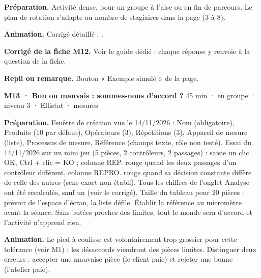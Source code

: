 \textbf{Préparation.} Activité dense, pour un groupe à l'aise ou en fin de parcours. Le plan de rotation s'adapte au nombre de stagiaires dans la page (3 à 8).\par
\textbf{Animation.} Corrigé détaillé : .\par
\textbf{\color{ok}Corrigé de la fiche M12.} Voir le guide dédié : chaque réponse y renvoie à la question de la fiche.\par
{\small\textbf{Repli ou remarque.} Bouton « Exemple simulé » de la page.}\par
\vspace{3pt}
\begin{tcolorbox}[act]\textbf{M13 · Bon ou mauvais : sommes-nous d'accord ?} \hfill {\small 45 min · en groupe · niveau 3 · Ellistat · mesures}\end{tcolorbox}
\textbf{Préparation.} Fenêtre de création vue le 14/11/2026 : Nom (obligatoire), Produits (10 par défaut), Opérateurs (3), Répétitions (3), Appareil de mesure (liste), Processus de mesure, Référence (champs texte, rôle non testé). Essai du 14/11/2026 sur un mini jeu (5 pièces, 2 contrôleurs, 2 passages) : saisie un clic = OK, Ctrl + clic = KO ; colonne REP. rouge quand les deux passages d'un contrôleur diffèrent, colonne REPRO. rouge quand sa décision constante diffère de celle des autres (sens exact non établi). Tous les chiffres de l'onglet Analyse ont été recalculés, sauf un (voir le corrigé). Taille du tableau pour 20 pièces : prévoir de l'espace d'écran, la liste défile. Établir la référence au micromètre avant la séance. Sans butées proches des limites, tout le monde sera d'accord et l'activité n'apprend rien.\par
\textbf{Animation.} Le pied à coulisse est volontairement trop grossier pour cette tolérance (voir M1) : les désaccords viendront des pièces limites. Distinguer deux erreurs : accepter une mauvaise pièce (le client paie) et rejeter une bonne (l'atelier paie).\par
